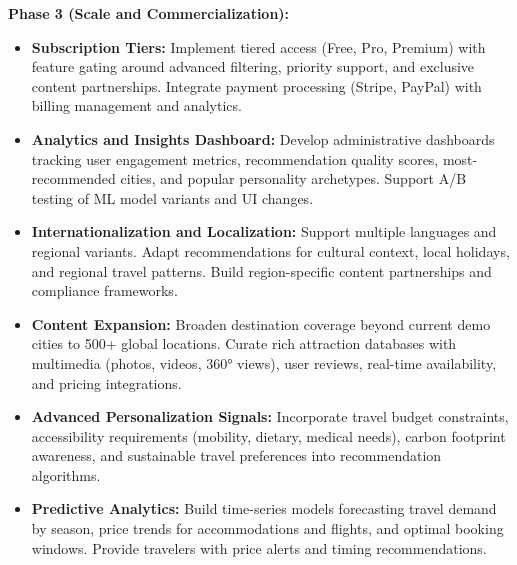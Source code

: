 \documentclass[12pt,oneside,openany]{report}
\begin{document}
\textbf{Phase 3 (Scale and Commercialization):}
\begin{itemize}
\item \textbf{Subscription Tiers:} Implement tiered access (Free, Pro, Premium) with feature gating around advanced filtering, priority support, and exclusive content partnerships. Integrate payment processing (Stripe, PayPal) with billing management and analytics.

\item \textbf{Analytics and Insights Dashboard:} Develop administrative dashboards tracking user engagement metrics, recommendation quality scores, most-recommended cities, and popular personality archetypes. Support A/B testing of ML model variants and UI changes.

\item \textbf{Internationalization and Localization:} Support multiple languages and regional variants. Adapt recommendations for cultural context, local holidays, and regional travel patterns. Build region-specific content partnerships and compliance frameworks.

\item \textbf{Content Expansion:} Broaden destination coverage beyond current demo cities to 500+ global locations. Curate rich attraction databases with multimedia (photos, videos, 360° views), user reviews, real-time availability, and pricing integrations.

\item \textbf{Advanced Personalization Signals:} Incorporate travel budget constraints, accessibility requirements (mobility, dietary, medical needs), carbon footprint awareness, and sustainable travel preferences into recommendation algorithms.

\item \textbf{Predictive Analytics:} Build time-series models forecasting travel demand by season, price trends for accommodations and flights, and optimal booking windows. Provide travelers with price alerts and timing recommendations.
\end{itemize}
\end{document}
